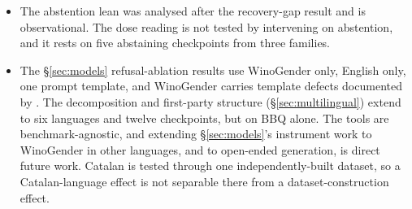 \begin{itemize}[nosep]
  response parses as an answer the other, unparsed responses fall in neither,
  and at least 8 items per group are required. The counts are items, not draws:
  58 abstentions for Qwen2.5 (422 answered) and 19 for Mistral (460 answered),
  and none for Phi-3.5-mini (480 answered) or the three OLMo-2 checkpoints
  (468--475 answered). They are not the abstention rates of \S\ref{sec:models},
  which come from 16 draws per item at temperature 0.8 and are nonzero for
  OLMo-2. On Mistral the behaviour\hy{}derived direction gives 4 patterns consistent
  with instrument failure and 1 outlier where the generic direction gave none.
  A general-purpose repair of the instrument is therefore open.
\item The abstention lean was analysed after the recovery-gap result and is
  observational. The dose reading is not tested by intervening on abstention,
  and it rests on five abstaining checkpoints from three families.
\item The \S\ref{sec:models} refusal-ablation results use WinoGender only,
  English only, one prompt template, and WinoGender carries template defects
  documented by \citet{gautam2024winopron}. The decomposition and first-party
  structure (\S\ref{sec:multilingual}) extend to six languages and twelve
  checkpoints, but on BBQ alone. The tools are benchmark-agnostic, and
  extending \S\ref{sec:models}'s instrument work to WinoGender in other
  languages, and to open-ended generation, is direct future work. Catalan is
  tested through one independently-built dataset, so a Catalan-language
  effect is not separable there from a dataset-construction effect.
\end{itemize}
